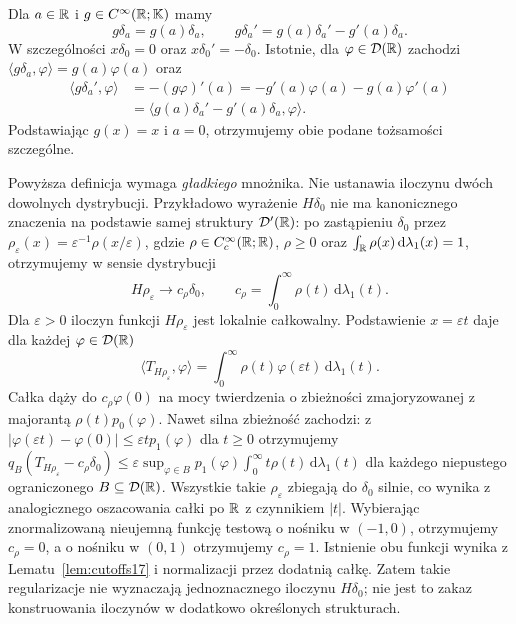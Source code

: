 \begin{przyklad}
\label{ex:multiply-delta20}
Dla $a\in\mathbb R$ i $g\in C^\infty(\mathbb R;\mathbb K)$ mamy
\[
 g\delta_a=g(a)\delta_a,\qquad
 g\delta_a'=g(a)\delta_a'-g'(a)\delta_a.
\]
W szczególności $x\delta_0=0$ oraz $x\delta_0'=-\delta_0$.
Istotnie, dla $\varphi\in\mathcal D(\mathbb R)$ zachodzi
$\langle g\delta_a,\varphi\rangle=g(a)\varphi(a)$ oraz
\[
\begin{aligned}
\langle g\delta_a',\varphi\rangle
&=-(g\varphi)'(a)=-g'(a)\varphi(a)-g(a)\varphi'(a)\\
&=\langle g(a)\delta_a'-g'(a)\delta_a,\varphi\rangle.
\end{aligned}
\]
Podstawiając $g(x)=x$ i $a=0$, otrzymujemy obie
podane tożsamości szczególne.
\end{przyklad}

\begin{uwaga}
\label{rem:no-product20}
Powyższa definicja wymaga \emph{gładkiego} mnożnika.
Nie ustanawia iloczynu dwóch dowolnych dystrybucji.
Przykładowo wyrażenie $H\delta_0$ nie ma kanonicznego
znaczenia na podstawie samej struktury $\mathcal D'(\mathbb R)$:
po zastąpieniu $\delta_0$ przez
$\rho_\varepsilon(x)=\varepsilon^{-1}\rho(x/\varepsilon)$,
gdzie $\rho\in C_c^\infty(\mathbb R;\mathbb R)$, $\rho\ge0$ oraz
$\int_\mathbb R\rho(x)\,\mathrm d\lambda_1(x)=1$,
otrzymujemy w sensie dystrybucji
\[
 H\rho_\varepsilon\longrightarrow c_\rho\delta_0,
 \qquad c_\rho=\int_0^\infty\rho(t)\,\mathrm d\lambda_1(t).
\]
Dla $\varepsilon>0$ iloczyn funkcji $H\rho_\varepsilon$
jest lokalnie całkowalny. Podstawienie $x=\varepsilon t$
daje dla każdej $\varphi\in\mathcal D(\mathbb R)$
\[
\langle T_{H\rho_\varepsilon},\varphi\rangle
=\int_0^\infty\rho(t)\varphi(\varepsilon t)\,\mathrm d\lambda_1(t).
\]
Całka dąży do $c_\rho\varphi(0)$ na mocy twierdzenia
o zbieżności zmajoryzowanej z majorantą
$\rho(t)p_0(\varphi)$.
Nawet silna zbieżność zachodzi: z
$|\varphi(\varepsilon t)-\varphi(0)|\le\varepsilon t p_1(\varphi)$
dla $t\ge0$ otrzymujemy
$q_B(T_{H\rho_\varepsilon}-c_\rho\delta_0)
\le\varepsilon\sup_{\varphi\in B}p_1(\varphi)
\int_0^\infty t\rho(t)\,\mathrm d\lambda_1(t)$
dla każdego niepustego ograniczonego $B\subseteq\mathcal D(\mathbb R)$.
Wszystkie takie $\rho_\varepsilon$ zbiegają do $\delta_0$
silnie, co wynika z analogicznego oszacowania całki po $\mathbb R$
z czynnikiem $|t|$. Wybierając znormalizowaną nieujemną
funkcję testową o nośniku w $(-1,0)$, otrzymujemy $c_\rho=0$,
a o nośniku w $(0,1)$ otrzymujemy $c_\rho=1$.
Istnienie obu funkcji wynika z Lematu~\ref{lem:cutoffs17}
i normalizacji przez dodatnią całkę.
Zatem takie regularizacje nie wyznaczają jednoznacznego
iloczynu $H\delta_0$; nie jest to zakaz konstruowania
iloczynów w dodatkowo określonych strukturach.
\end{uwaga}

